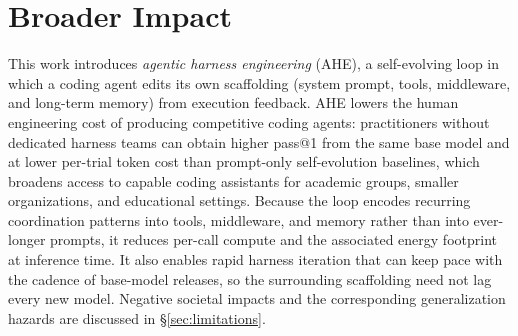 \section{Broader Impact}
\label{app:broader-impact}

This work introduces \emph{agentic harness engineering} (AHE), a self-evolving loop in which a coding agent edits its own scaffolding (system prompt, tools, middleware, and long-term memory) from execution feedback. AHE lowers the human engineering cost of producing competitive coding agents: practitioners without dedicated harness teams can obtain higher pass@1 from the same base model and at lower per-trial token cost than prompt-only self-evolution baselines, which broadens access to capable coding assistants for academic groups, smaller organizations, and educational settings. Because the loop encodes recurring coordination patterns into tools, middleware, and memory rather than into ever-longer prompts, it reduces per-call compute and the associated energy footprint at inference time. It also enables rapid harness iteration that can keep pace with the cadence of base-model releases, so the surrounding scaffolding need not lag every new model. Negative societal impacts and the corresponding generalization hazards are discussed in \S\ref{sec:limitations}.
